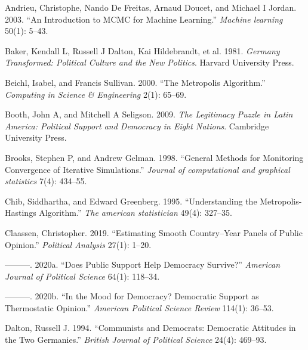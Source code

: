 \documentclass[12pt,english,a4paper,oneside]{article}
\newlength{\cslhangindent}
\newlength{\cslentryspacingunit} %
\newenvironment{CSLReferences}[2] %
 {%
  \setlength{\parindent}{0pt}
  \ifodd #1
  \let\oldpar\par
  \def\par{\hangindent=\cslhangindent\oldpar}
  \fi
  \setlength{\parskip}{#2\cslentryspacingunit}
 }%
 {}
\theoremstyle{definition}
\theoremstyle{definition}
\theoremstyle{definition}
\theoremstyle{definition}
\theoremstyle{remark}
\begin{document}
\hypertarget{refs}{}
\begin{CSLReferences}{1}{0}
\leavevmode{}%
Andrieu, Christophe, Nando De Freitas, Arnaud Doucet, and Michael I Jordan. 2003. {``An Introduction to MCMC for Machine Learning.''} \emph{Machine learning} 50(1): 5--43.

\leavevmode{}%
Baker, Kendall L, Russell J Dalton, Kai Hildebrandt, et al. 1981. \emph{Germany Transformed: Political Culture and the New Politics}. Harvard University Press.

\leavevmode{}%
Beichl, Isabel, and Francis Sullivan. 2000. {``The Metropolis Algorithm.''} \emph{Computing in Science \& Engineering} 2(1): 65--69.

\leavevmode{}%
Booth, John A, and Mitchell A Seligson. 2009. \emph{The Legitimacy Puzzle in Latin America: Political Support and Democracy in Eight Nations}. Cambridge University Press.

\leavevmode{}%
Brooks, Stephen P, and Andrew Gelman. 1998. {``General Methods for Monitoring Convergence of Iterative Simulations.''} \emph{Journal of computational and graphical statistics} 7(4): 434--55.

\leavevmode{}%
Chib, Siddhartha, and Edward Greenberg. 1995. {``Understanding the Metropolis-Hastings Algorithm.''} \emph{The american statistician} 49(4): 327--35.

\leavevmode{}%
Claassen, Christopher. 2019. {``Estimating Smooth Country--Year Panels of Public Opinion.''} \emph{Political Analysis} 27(1): 1--20.

\leavevmode{}%
---------. 2020a. {``Does Public Support Help Democracy Survive?''} \emph{American Journal of Political Science} 64(1): 118--34.

\leavevmode{}%
---------. 2020b. {``In the Mood for Democracy? Democratic Support as Thermostatic Opinion.''} \emph{American Political Science Review} 114(1): 36--53.

\leavevmode{}%
Dalton, Russell J. 1994. {``Communists and Democrats: Democratic Attitudes in the Two Germanies.''} \emph{British Journal of Political Science} 24(4): 469--93.


\end{CSLReferences}
\end{document}
